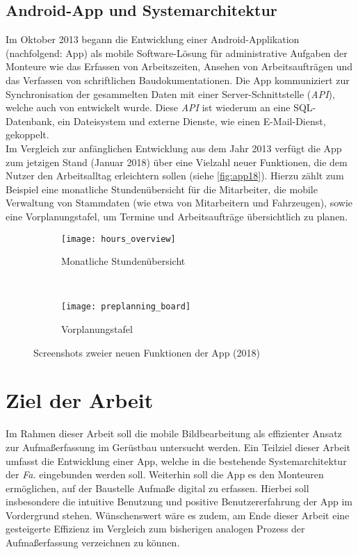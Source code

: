 \subsection{Android-App und Systemarchitektur}
Im Oktober 2013 begann die Entwicklung einer Android-Applikation (nachfolgend: App) als mobile Software-Lösung für administrative Aufgaben der Monteure wie das Erfassen von Arbeitszeiten, Ansehen von Arbeitsaufträgen und das Verfassen von schriftlichen Baudokumentationen.
Die App kommuniziert zur Synchronisation der gesammelten Daten mit einer Server-Schnittstelle (\emph{API}), welche auch von \vr{} entwickelt wurde.
Diese \emph{API} ist wiederum an eine SQL-Datenbank, ein Dateisystem und externe Dienste, wie einen E-Mail-Dienst, gekoppelt. \\

Im Vergleich zur anfänglichen Entwicklung aus dem Jahr 2013 verfügt die App zum jetzigen Stand (Januar 2018) über eine Vielzahl neuer Funktionen, die dem Nutzer den Arbeitsalltag erleichtern sollen (siehe \autoref{fig:app18}).
Hierzu zählt zum Beispiel eine monatliche Stundenübersicht für die Mitarbeiter, die mobile Verwaltung von Stammdaten (wie etwa von Mitarbeitern und Fahrzeugen), sowie eine Vorplanungstafel, um Termine und Arbeitsaufträge übersichtlich zu planen. 
\begin{figure}[h]
  \begin{subfigure}[t]{0.4\textwidth}
    \centering
    \texttt{[image: hours\_overview]}
    \caption{Monatliche Stundenübersicht}
  \end{subfigure}
  ~
  \begin{subfigure}[t]{0.4\textwidth}
    \centering
    \texttt{[image: preplanning\_board]}
    \caption{Vorplanungstafel}
  \end{subfigure}
  \centering
  \caption{Screenshots zweier neuen Funktionen der App (2018)}
  \label{fig:app18}
\end{figure}

\section{Ziel der Arbeit}
Im Rahmen dieser Arbeit soll die mobile Bildbearbeitung als effizienter Ansatz zur Aufmaßerfassung im Gerüstbau untersucht werden.
Ein Teilziel dieser Arbeit umfasst die Entwicklung einer App, welche in die bestehende Systemarchitektur der \emph{Fa.} \vr{} eingebunden werden soll.
Weiterhin soll die App es den Monteuren ermöglichen, auf der Baustelle Aufmaße digital zu erfassen.
Hierbei soll insbesondere die intuitive Benutzung und positive Benutzererfahrung der App im Vordergrund stehen.
Wünschenswert wäre es zudem, am Ende dieser Arbeit eine gesteigerte Effizienz im Vergleich zum bisherigen analogen Prozess der Aufmaßerfassung verzeichnen zu können.

